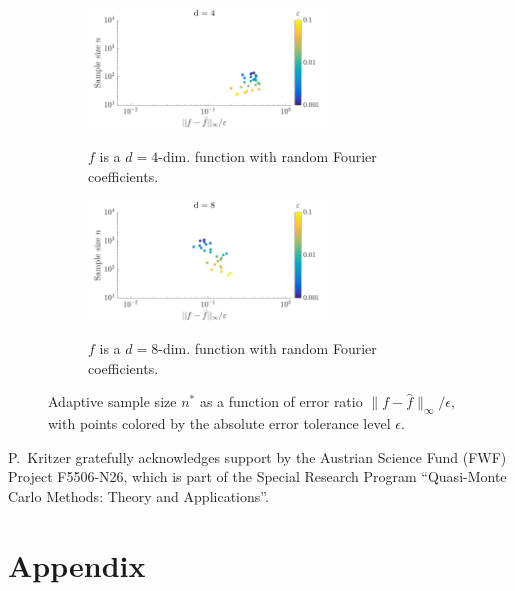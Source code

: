 \documentclass[USenglish]{article}
\theoremstyle{dgthm}
\theoremstyle{dgthm}
\theoremstyle{dgthm}
\theoremstyle{dgthm}
\theoremstyle{dgdef}
\theoremstyle{definition}
\begin{document}
\begin{figure}
\centering
\begin{subfigure}{\textwidth}
\centering
\includegraphics[width=0.7\textwidth]{d4}
\label{fig:four1}
\caption{$f$ is a $d=4$-dim. function with random Fourier coefficients.}
\end{subfigure}
\begin{subfigure}{\textwidth}
\centering
\includegraphics[width=0.7\textwidth]{d8}
\label{fig:four2}
\caption{$f$ is a $d=8$-dim. function with random Fourier coefficients.}
\end{subfigure}
\caption{Adaptive sample size $n^*$ as a function of error ratio $\|f - \hat{f}\|_{\infty}/\epsilon$, with points colored by the absolute error tolerance level $\epsilon$.}
\label{fig:four}
\end{figure}

\begin{acknowledgement}
 P.~Kritzer gratefully acknowledges support by the Austrian Science Fund (FWF) Project  F5506-N26, 
which is part of the Special Research Program ``Quasi-Monte Carlo Methods: Theory and Applications''.
\end{acknowledgement}





\section*{Appendix}
\end{document}
